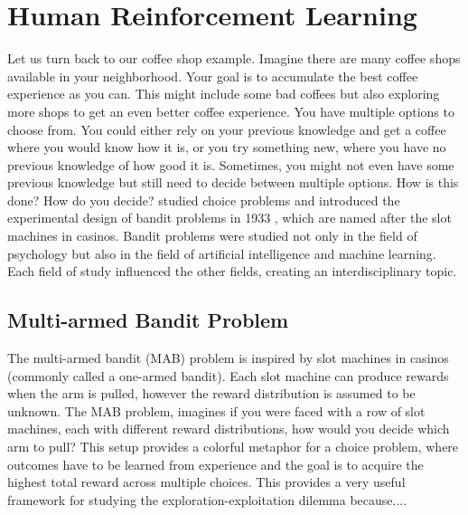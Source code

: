 \section{Human Reinforcement Learning}
Let us turn back to our coffee shop example. Imagine there are many coffee shops available in your neighborhood. Your goal is to accumulate the best coffee experience as you can. %
This might include some bad coffees but also exploring more shops to get an even better coffee experience. 
You have multiple options to choose from. You could either rely on your previous knowledge and get a coffee where you would know how it is, or you try something new, where you have no previous knowledge of how good it is.  %
Sometimes, you might not even have some previous knowledge but still need to decide between multiple options. %
How is this done? How do you decide? 
\citeauthor{thompson1933likelihood} studied choice problems and introduced the experimental design of bandit problems in 1933 \citep{thompson1933likelihood}, which are named after the slot machines in casinos. Bandit problems were studied not only in the field of psychology but also in the field of artificial intelligence and machine learning. Each field of study influenced the other fields, creating an interdisciplinary topic.   

\subsection{Multi-armed Bandit Problem}
The multi-armed bandit (MAB) problem is inspired by slot machines in casinos (commonly called a one-armed bandit). Each slot machine can produce rewards when the arm is pulled, however the reward distribution is assumed to be unknown. The MAB problem, imagines if you were faced with a row of slot machines, each with different reward distributions, how would you decide which arm to pull? This setup provides a colorful metaphor for a choice problem, where outcomes have to be learned from experience and the goal is to acquire the highest total reward across multiple choices. This provides a very useful framework for studying the exploration-exploitation dilemma because....

